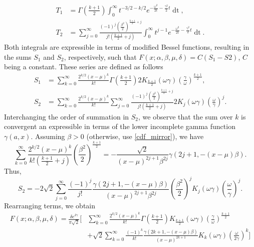 \documentclass[10pt,a4paper,oneside]{article}
\numberwithin{equation}{section}
\begin{document}
\begin{align}
T_1 &= \Gamma\left(\frac{k+1}{2}\right)\int_0^{\infty}t^{-3/2-k/2} e^{-\frac{\omega^2}{2t} - \frac{\gamma^2}{2}t} \mathop{dt},\\
T_2 &= \sum_{j=0}^{\infty} \frac{(-1)^j \left(\frac{\beta^2}{2}\right)^{\frac{k+1}{2}+j}}{j! (\frac{k+1}{2}+ j)}\int_0^{\infty} t^{j-1} e^{-\frac{\omega^2}{2t} - \frac{\gamma^2}{2}t} \mathop{dt}.
\end{align}
Both integrals are expressible in terms of modified Bessel functions, resulting in the sums $S_1$ and $S_2$, respectively, such that $F(x;\alpha, \beta, \mu, \delta) = C (S_1 - S2)$, $C$ being a constant. These series are defined as follows
\begin{align}
S_1 &= \sum_{k=0}^{\infty}\frac{2^{k/2}(x-\mu)^k}{k!} \Gamma\left(\frac{k+1}{2}\right)2 K_{\frac{k+1}{2}}(\omega \gamma) \left(\frac{\gamma}{\omega}\right)^{\frac{k+1}{2}},\\
S_2 &= \sum_{k=0}^{\infty}\frac{2^{k/2}(x-\mu)^k}{k!}\sum_{j=0}^{\infty}\frac{(-1)^j \left(\frac{\beta^2}{2}\right)^{\frac{k+1}{2}+j}}{j! (\frac{k+1}{2}+ j)} 2 K_j(\omega \gamma) \left(\frac{\omega}{\gamma}\right)^j.
\end{align}
Interchanging the order of summation in $S_2$, we observe that the sum over $k$ is convergent an expressible in terms of the lower incomplete gamma function $\gamma(a, x)$. Assuming $\beta > 0$ (otherwise, use \eqref{cdf_mirror}), we have
\begin{equation}
\sum_{k=0}^{\infty}\frac{2^{k/2}(x-\mu)^k}{k! (\frac{k+1}{2}+ j)} \left(\frac{\beta^2}{2}\right)^{\frac{k+1}{2}} = -\frac{\sqrt{2}}{(x-\mu)^{2j+1}\beta^{2j}} \gamma \left(2j + 1, -(x-\mu)\beta\right).
\end{equation}
Thus,
\begin{equation}
S_2 = -2\sqrt{2} \sum_{j=0}^{\infty} \frac{(-1)^j}{j!}\frac{\gamma \left(2j + 1, -(x-\mu)\beta\right)}{(x-\mu)^{2j+1}\beta^{2j}} \left(\frac{\beta^2}{2}\right)^j  K_j(\omega \gamma) \left(\frac{\omega}{\gamma}\right)^j.
\end{equation}
Rearranging terms, we obtain
\begin{align}\label{general_xmu_two_series}
F(x;\alpha, \beta, \mu, \delta) = \frac{\delta e^{\delta \gamma}}{\pi \sqrt{2}} \bigg[& \sum_{k=0}^{\infty}\frac{2^{k/2}(x-\mu)^k}{k!} \Gamma\left(\frac{k+1}{2}\right) K_{\frac{k+1}{2}}(\omega \gamma) \left(\frac{\gamma}{\omega}\right)^{\frac{k+1}{2}}\nonumber\\
& + \sqrt{2}\sum_{k=0}^{\infty} \frac{(-1)^k}{k!}\frac{\gamma \left(2k + 1, -(x-\mu)\beta\right)}{(x-\mu)^{2k+ 1}}  K_k(\omega \gamma) \left(\frac{\omega}{2\gamma}\right)^k \bigg]
\end{align}
\end{document}
